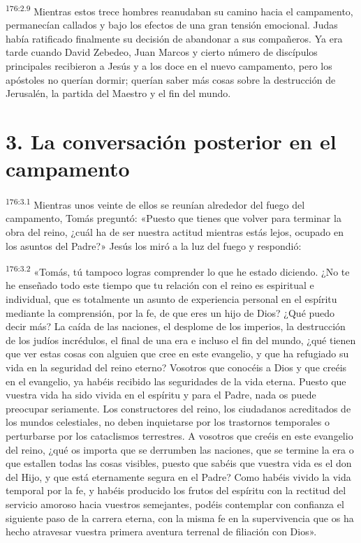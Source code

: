 \par 
\textsuperscript{176:2.9} Mientras estos trece hombres reanudaban su camino hacia el campamento, permanecían callados y bajo los efectos de una gran tensión emocional. Judas había ratificado finalmente su decisión de abandonar a sus compañeros. Ya era tarde cuando David Zebedeo, Juan Marcos y cierto número de discípulos principales recibieron a Jesús y a los doce en el nuevo campamento, pero los apóstoles no querían dormir; querían saber más cosas sobre la destrucción de Jerusalén, la partida del Maestro y el fin del mundo.

\section*{3. La conversación posterior en el campamento}
\par 
\textsuperscript{176:3.1} Mientras unos veinte de ellos se reunían alrededor del fuego del campamento, Tomás preguntó: «Puesto que tienes que volver para terminar la obra del reino, ¿cuál ha de ser nuestra actitud mientras estás lejos, ocupado en los asuntos del Padre?» Jesús los miró a la luz del fuego y respondió:

\par 
\textsuperscript{176:3.2} «Tomás, tú tampoco logras comprender lo que he estado diciendo. ¿No te he enseñado todo este tiempo que tu relación con el reino es espiritual e individual, que es totalmente un asunto de experiencia personal en el espíritu mediante la comprensión, por la fe, de que eres un hijo de Dios? ¿Qué puedo decir más? La caída de las naciones, el desplome de los imperios, la destrucción de los judíos incrédulos, el final de una era e incluso el fin del mundo, ¿qué tienen que ver estas cosas con alguien que cree en este evangelio, y que ha refugiado su vida en la seguridad del reino eterno? Vosotros que conocéis a Dios y que creéis en el evangelio, ya habéis recibido las seguridades de la vida eterna. Puesto que vuestra vida ha sido vivida en el espíritu y para el Padre, nada os puede preocupar seriamente. Los constructores del reino, los ciudadanos acreditados de los mundos celestiales, no deben inquietarse por los trastornos temporales o perturbarse por los cataclismos terrestres. A vosotros que creéis en este evangelio del reino, ¿qué os importa que se derrumben las naciones, que se termine la era o que estallen todas las cosas visibles, puesto que sabéis que vuestra vida es el don del Hijo, y que está eternamente segura en el Padre? Como habéis vivido la vida temporal por la fe, y habéis producido los frutos del espíritu con la rectitud del servicio amoroso hacia vuestros semejantes, podéis contemplar con confianza el siguiente paso de la carrera eterna, con la misma fe en la supervivencia que os ha hecho atravesar vuestra primera aventura terrenal de filiación con Dios».

